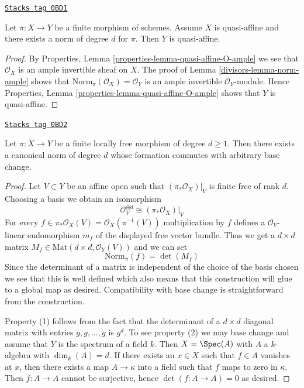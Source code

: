 \begin{lemma}
\label{divisors-lemma-norm-quasi-affine}
\href{https://stacks.math.columbia.edu/tag/0BD1}{\texttt{Stacks tag 0BD1}}

Let $\pi : X \to Y$ be a finite morphism of schemes. Assume $X$ is quasi-affine
and there exists a norm of degree $d$ for $\pi$. Then $Y$ is quasi-affine.
\end{lemma}

\begin{proof}

By Properties, Lemma \ref{properties-lemma-quasi-affine-O-ample}
we see that $\mathcal{O}_X$ is an ample invertible sheaf on $X$.
The proof of Lemma \ref{divisors-lemma-norm-ample} shows that
$\text{Norm}_\pi(\mathcal{O}_X) = \mathcal{O}_Y$
is an ample invertible $\mathcal{O}_Y$-module. Hence
Properties, Lemma \ref{properties-lemma-quasi-affine-O-ample}
shows that $Y$ is quasi-affine.
\end{proof}

\begin{lemma}
\label{divisors-lemma-finite-locally-free-has-norm}
\href{https://stacks.math.columbia.edu/tag/0BD2}{\texttt{Stacks tag 0BD2}}

Let $\pi : X \to Y$ be a finite locally free morphism of degree $d \geq 1$.
Then there exists a canonical norm of degree $d$ whose formation commutes
with arbitrary base change.
\end{lemma}

\begin{proof}
Let $V \subset Y$ be an affine open such that $(\pi_*\mathcal{O}_X)|_V$
is finite free of rank $d$. Choosing a basis we obtain an isomorphism
$$
\mathcal{O}_V^{\oplus d} \cong (\pi_*\mathcal{O}_X)|_V
$$
For every $f \in \pi_*\mathcal{O}_X(V) = \mathcal{O}_X(\pi^{-1}(V))$
multiplication by $f$ defines a $\mathcal{O}_V$-linear endomorphism
$m_f$ of the displayed free vector bundle. Thus we get a $d \times d$
matrix $M_f \in \text{Mat}(d \times d, \mathcal{O}_Y(V))$ and we can set
$$
\text{Norm}_\pi(f) = \det(M_f)
$$
Since the determinant of a matrix is independent of the choice of
the basis chosen we see that this is well defined which also means
that this construction will glue to a global map as desired.
Compatibility with base change is straightforward from the construction.

\medskip\noindent
Property (1) follows from the fact that the determinant of a
$d \times d$ diagonal matrix with entries $g, g, \ldots, g$ is $g^d$.
To see property (2) we may base change and assume that $Y$ is the
spectrum of a field $k$. Then $X = \Spec(A)$ with $A$ a $k$-algebra
with $\dim_k(A) = d$. If there exists an $x \in X$ such that
$f \in A$ vanishes at $x$, then there exists a map $A \to \kappa$
into a field such that $f$ maps to zero in $\kappa$. Then
$f : A \to A$ cannot be surjective, hence $\det(f : A \to A) = 0$
as desired.
\end{proof}

